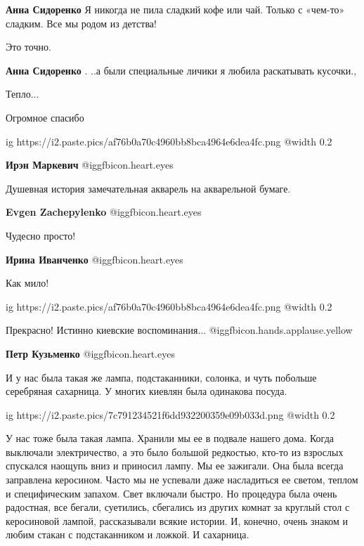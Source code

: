 \begin{itemize}
\begin{itemize}
\textbf{Анна Сидоренко} Я никогда не пила сладкий кофе или чай. Только с «чем-то» сладким. Все мы родом из детства!

Это точно.

\textbf{Анна Сидоренко} . ..а были специальные личики я любила раскатывать кусочки.,
\end{itemize} %

Тепло...

Огромное спасибо

\ifcmt
  ig https://i2.paste.pics/af76b0a70c4960bb8bca4964e6dea4fc.png
  @width 0.2
\fi

\textbf{Ирэн Маркевич}  @igg{fbicon.heart.eyes} 

Душевная история замечательная акварель на акварельной бумаге.

\textbf{Evgen Zachepylenko}  @igg{fbicon.heart.eyes} 

Чудесно просто!

\textbf{Ирина Иванченко}  @igg{fbicon.heart.eyes} 

Как мило!

\ifcmt
  ig https://i2.paste.pics/af76b0a70c4960bb8bca4964e6dea4fc.png
  @width 0.2
\fi


Прекрасно! Истинно киевские воспоминания... @igg{fbicon.hands.applause.yellow} 

\textbf{Петр Кузьменко}  @igg{fbicon.heart.eyes} 


И у нас была такая же лампа, подстаканники, солонка, и чуть побольше серебряная
сахарница. У многих киевлян была одинакова посуда.



\ifcmt
  ig https://i2.paste.pics/7c791234521f6dd932200359e09b033d.png
  @width 0.2
\fi


У нас тоже была такая лампа. Хранили мы ее в подвале нашего дома. Когда выключали
электричество, а это было большой редкостью, кто-то из взрослых спускался наощупь
вниз и приносил лампу. Мы ее зажигали. Она была всегда заправлена керосином. Часто
мы не успевали даже насладиться ее светом, теплом и специфическим запахом. Свет
включали быстро. Но процедура была очень радостная, все
бегали, суетились, сбегались из других комнат за круглый стол с керосиновой
лампой, рассказывали всякие истории. И, конечно, очень знаком и любим стакан с
подстаканником и ложкой. И сахарница.


\end{itemize}
